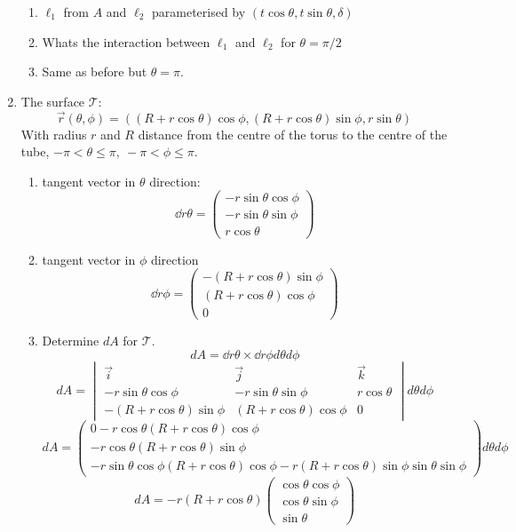 \documentclass{X:/Documents/Coding/Latex/myassignment}
\begin{document}
\begin{enumerate}
\begin{enumerate}
		\item $\ell_1$ from $A$ and $\ell_2$ parameterised by $(t\cos\theta, t\sin\theta, \delta)$
		\item Whats the interaction between $\ell_1$ and $\ell_2$ for $\theta = \pi/2$
		\item Same as before but $\theta = \pi$.
	\end{enumerate}
	\item The surface $\mathcal{T}$:
	\[\vec r(\theta,\phi) = \left((R + r\cos\theta) \cos\phi, (R+r\cos\theta) \sin\phi,r\sin\theta\right)\]
	With radius $r$ and $R$ distance from the centre of the torus to the centre of the tube, $-\pi < \theta \leq \pi, \ -\pi < \phi \leq \pi$.
	\begin{enumerate}
		\item tangent vector in $\theta$ direction:
		\[\dd{r}{\theta} = \begin{pmatrix}
			-r\sin\theta\cos\phi\\-r\sin\theta\sin\phi\\ r\cos\theta
		\end{pmatrix}\]		
		\item tangent vector in $\phi$ direction
		\[\dd{r}{\phi} = \begin{pmatrix}
			-(R+r\cos\theta)\sin\phi \\ (R+r\cos\theta)\cos\phi\\0
		\end{pmatrix}\]
		\item Determine $dA$ for $\mathcal{T}$.
		\[	dA = \dd r\theta \times \dd r\phi d\theta d\phi\]
		\[dA = \begin{vmatrix}
			\vec i & \vec j &\vec k \\
			-r\sin\theta\cos\phi&-r\sin\theta\sin\phi& r\cos\theta\\
			-(R+r\cos\theta)\sin\phi & (R+r\cos\theta)\cos\phi&0
		\end{vmatrix}d\theta d\phi\]
		\[dA = \begin{pmatrix}
			0 - r\cos\theta(R+r\cos\theta)\cos\phi\\
			-r\cos\theta (R+r\cos\theta)\sin\phi\\
			-r\sin\theta\cos\phi (R+r\cos\theta)\cos\phi - r(R+r\cos\theta)\sin\phi \sin\theta\sin\phi
		\end{pmatrix}d\theta d\phi\]
		\[dA = - r(R+r\cos\theta)\begin{pmatrix}
			\cos\theta\cos\phi\\
			\cos\theta\sin\phi\\
			\sin\theta

\end{pmatrix}\]
\end{enumerate}
\end{enumerate}
\end{document}
